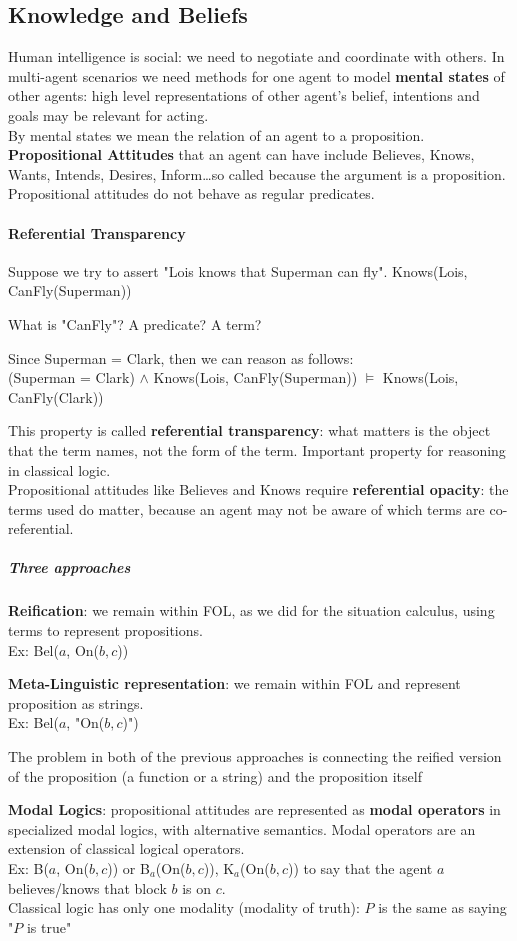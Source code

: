 \documentclass[10pt]{report}
\begin{document}
\subsection{Knowledge and Beliefs}
Human intelligence is social: we need to negotiate and coordinate with others. In multi-agent scenarios we need methods for one agent to model \textbf{mental states} of other agents: high level representations of other agent's belief, intentions and goals may be relevant for acting.\\
By mental states we mean the relation of an agent to a proposition. \textbf{Propositional Attitudes} that an agent can have include Believes, Knows, Wants, Intends, Desires, Inform\ldots so called because the argument is a proposition. Propositional attitudes do not behave as regular predicates.
\paragraph{Referential Transparency} Suppose we try to assert "Lois knows that Superman can fly". Knows(Lois, CanFly(Superman))
\begin{list}{}{}
	\item What is "CanFly"? A predicate? A term?
	\item Since Superman = Clark, then we can reason as follows:\\
	(Superman = Clark) $\wedge$ Knows(Lois, CanFly(Superman)) $\vDash$ Knows(Lois, CanFly(Clark))
\end{list}
This property is called \textbf{referential transparency}: what matters is the object that the term names, not the form of the term. Important property for reasoning in classical logic.\\
Propositional attitudes like Believes and Knows require \textbf{referential opacity}: the terms used do matter, because an agent may not be aware of which terms are co-referential.
\subparagraph{Three approaches}
\begin{list}{}{}
	\item \textbf{Reification}: we remain within FOL, as we did for the situation calculus, using terms to represent propositions.\\
	Ex: Bel($a$, On($b,c$))
	\item \textbf{Meta-Linguistic representation}: we remain within FOL and represent proposition as strings.\\
	Ex: Bel($a$, "On($b,c$)")
	\item The problem in both of the previous approaches is connecting the reified version of the proposition (a function or a string) and the proposition itself
	\item \textbf{Modal Logics}: propositional attitudes are represented as \textbf{modal operators} in specialized modal logics, with alternative semantics. Modal operators are an extension of classical logical operators.\\
	Ex: B($a$, On($b,c$)) or B$_a$(On($b,c$)), K$_a$(On($b,c$)) to say that the agent $a$ believes/knows that block $b$ is on $c$.\\
	Classical logic has only one modality (modality of truth): $P$ is the same as saying "$P$ is true"
\end{list}
\end{document}
